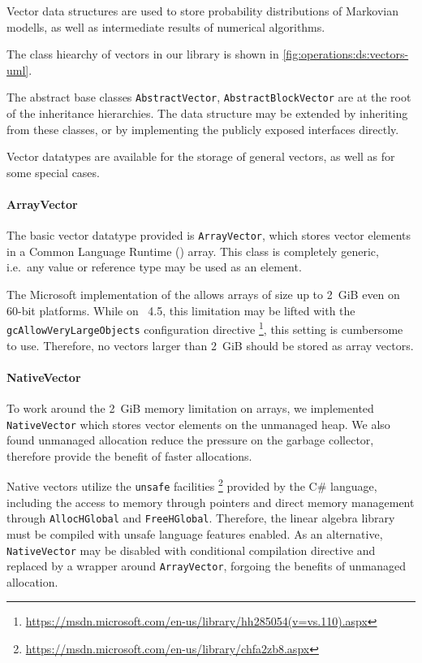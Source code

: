 Vector data structures are used to store probability distributions of
Markovian modells, as well as intermediate results of numerical
algorithms.

The class hiearchy of vectors in our library is shown in
\cref{fig:operations:ds:vectors-uml}.

The abstract base classes \texttt{AbstractVector},
\texttt{AbstractBlockVector} are at the root of the inheritance
hierarchies. The data structure may be extended by inheriting from
these classes, or by implementing the publicly exposed interfaces
directly.

Vector datatypes are available for the storage of general vectors, as
well as for some special cases.

\paragraph{ArrayVector}

The basic vector datatype provided is \texttt{ArrayVector}, which
stores vector elements in a Common Language Runtime ()
array. This class is completely generic, i.e.~any  value or
reference type may be used as an element.

The Microsoft  implementation of the  allows
arrays of size up to 2~GiB even on 60-bit platforms. While on
~4.5, this limitation may be lifted with the
\texttt{gcAllowVeryLargeObjects} configuration directive%
\footnote{\url{https://msdn.microsoft.com/en-us/library/hh285054(v=vs.110).aspx}},
this setting is cumbersome to use. Therefore, no vectors larger than
2~GiB should be stored as array vectors.

\paragraph{NativeVector}

To work around the 2~GiB memory limitation on  arrays, we
implemented \texttt{NativeVector} which stores vector elements on the
unmanaged heap. We also found unmanaged allocation reduce the pressure
on the garbage collector, therefore provide the benefit of faster
allocations.

Native vectors utilize the \texttt{unsafe} facilities%
\footnote{\url{https://msdn.microsoft.com/en-us/library/chfa2zb8.aspx}}
provided by the C\# language, including the access to memory through
pointers and direct memory management through \texttt{AllocHGlobal}
and \texttt{FreeHGlobal}. Therefore, the linear algebra library must
be compiled with unsafe language features enabled. As an alternative,
\texttt{NativeVector} may be disabled with conditional compilation
directive and replaced by a wrapper around \texttt{ArrayVector},
forgoing the benefits of unmanaged allocation.


